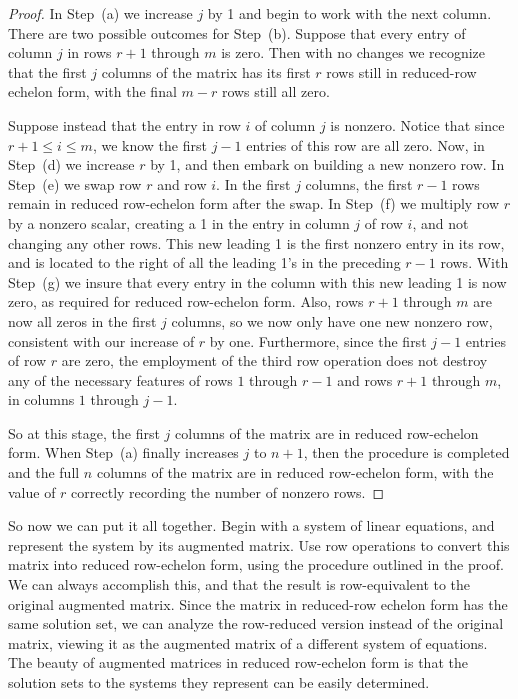 \documentclass{ximera}
\begin{document}
\begin{theorem}
\begin{proof}
In Step~(a) we increase $j$ by 1 and begin to work with the next column.
There are two possible outcomes for Step~(b).  Suppose that every entry
of column $j$ in rows $r+1$ through $m$ is zero.  Then with no changes
we recognize that the first $j$ columns of the matrix has its first
$r$ rows still in reduced-row echelon form, with the final $m-r$ rows
still all zero.

Suppose instead that the entry in row $i$ of column $j$ is nonzero.
Notice that since $r+1\leq i\leq m$, we know the first $j-1$ entries
of this row are all zero.  Now, in Step~(d) we increase $r$ by 1, and
then embark on building a new nonzero row.  In Step~(e) we swap row $r$
and row $i$.  In the first $j$ columns, the first $r-1$ rows remain in
reduced row-echelon form after the swap.  In Step~(f) we multiply row
$r$ by a nonzero scalar, creating a 1 in the entry in column $j$ of
row $i$, and not changing any other rows.  This new leading 1 is the
first nonzero entry in its row, and is located to the right of all the
leading 1's in the preceding $r-1$ rows.  With Step~(g) we insure that
every entry in the column with this new leading 1 is now zero, as
required for reduced row-echelon form.  Also, rows $r+1$ through $m$
are now all zeros in the first $j$ columns, so we now only have one
new nonzero row, consistent with our increase of $r$ by one.
Furthermore, since the first $j-1$ entries of row $r$ are zero, the
employment of the third row operation does not destroy any of the
necessary features of rows $1$ through $r-1$ and rows $r+1$ through
$m$, in columns $1$ through $j-1$.

So at this stage, the first $j$ columns of the matrix are in reduced
row-echelon form.  When Step~(a) finally increases $j$ to $n+1$, then
the procedure is completed and the full $n$ columns of the matrix are
in reduced row-echelon form, with the value of $r$ correctly recording
the number of nonzero rows.
\end{proof}
\end{theorem}

So now we can put it all together.  Begin with a system of linear
equations, and represent the system by its augmented matrix.  Use row
operations to convert this matrix into reduced row-echelon form, using
the procedure outlined in the proof.  We can always accomplish this,
and that the result is row-equivalent to the original augmented
matrix.  Since the matrix in reduced-row echelon form has the same
solution set, we can analyze the row-reduced version instead of the
original matrix, viewing it as the augmented matrix of a different
system of equations.  The beauty of augmented matrices in reduced
row-echelon form is that the solution sets to the systems they
represent can be easily determined.
\end{document}
